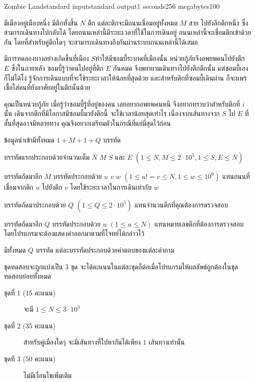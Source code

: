 \documentclass[11pt,a4paper]{article}
\begin{document}
\begin{problem}{Zombie Land}{standard input}{standard output}{1 seconds}{256 megabytes}{100}

มีเมืองอยู่เมืองหนึ่ง มีตึกทั้งสิ้น $N$ ตึก แต่ละตึกจะมีถนนเชื่อมอยู่ทั้งหมด $M$ สาย ไปยังอีกตึกหนึ่ง ซึ่งสามารถเดินทางไปกลับได้ โดยถนนเหล่านี้มีระยะเวลาที่ใช้ในการเดินอยู่ ถนนเหล่านี้จะเชื่อมตึกเข้าด้วยกัน โดยที่สำหรับคู่ตึกใดๆ จะสามารถเดินทางถึงกันผ่านระบบถนนเหล่านี้ได้เสมอ

มีการทดลองบางอย่างเกิดขึ้นที่เมือง $S$ทำให้มีซอมบี้ระบาดที่เมืองนั้น หน่วยกู้ภัยจึงอพยพคนไปยังตึก $E$ ซึ่งในภายหลัง ซอมบี้รู้ว่าคนไปอยู่ที่ตึก $E$ กันหมด จึงพยายามเดินทางไปยังตึกตึกนั้น แต่ซอมบี้เองก็ไม่ได้โง่ รู้จักการเดินแบบที่จะใช้ระยะเวลาให้น้อยที่สุดด้วย และสำหรับตึกที่ซอมบี้เดินผ่าน ก็จะแพร่เชื้อใส่คนที่ยังอาศัยอยู่ในตึกนั้นด้วย

คุณเป็นหน่วยกู้ภัย เมื่อรู้ว่าซอมบี้รู้ที่อยู่ของคน เลยอยากอพยพคนหนี จึงอยากทราบว่าสำหรับตึกที่ $i$ นั้น เดินจากตึกที่มีโอกาสมีซอมบี้มายังตึกนี้ จะใช้เวลาน้อยสุดเท่าไร เนื่องจากเส้นทางจาก $S$ ไป $E$ ที่สั้นที่สุดอาจมีหลายทาง คุณจึงอยากเตรียมตัวในกรณีที่แย่มี่สุดไว้ก่อน

\InputFile
ข้อมูลนำเข้ามีทั้งหมด $1 + M + 1 + Q$ บรรทัด

บรรทัดแรกประกอบด้วยจำนวนเต็ม $N$ $M$ $S$ และ $E$ $(1 \leq N, M \leq 2 \cdot 10^5, 1 \leq S, E \leq N)$ 

บรรทัดถัดมาอีก $M$ บรรทัดประกอบด้วย $u$ $v$ $w$ $(1 \leq u != v \leq N, 1 \leq w \leq 10^9)$ แทนถนนที่เชื่อมจากตึก $u$ ไปยังตึก $v$ โดยใช้ระยะเวลาในการเดินเท่ากับ $w$

บรรทัดถัดมาประกอบด้วย $Q$ $(1 \leq Q \leq 2 \cdot 10^5)$ แทนจำนวนตึกที่คุณต้องการตรวจสอบ

บรรทัดถัดมาอีก $Q$ บรรทัดประกอบด้วย $u$ $(1 \leq u \leq N)$ แทนหมายเลขตึกที่ต้องการตรวจสอบ โดยโปรแกรมจะต้องแสดงค่าออกมาตามที่โจทย์ได้กล่าวไว้

\OutputFile
มีทั้งหมด $Q$ บรรทัด แต่ละบรรทัดประกอบด้วยคำตอบของแต่ละคำถาม

\Scoring
ชุดทดสอบจะถูกแบ่งเป็น 3 ชุด จะได้คะแนนในแต่ละชุดก็ต่อเมื่อโปรแกรมให้ผลลัพธ์ถูกต้องในชุดทดสอบย่อยทั้งหมด

\begin{description}

\item[ชุดที่ 1 (15 คะแนน)] จะมี $ 1 \leq N \leq 3 \cdot 10^3 $

\item[ชุดที่ 2 (35 คะแนน)] สำหรับคู่เมืองใดๆ จะมีเส้นทางที่ไปหากันได้เพียง $1$ เส้นทางเท่านั้น

\item[ชุดที 3 (50 คะแนน)] ไม่มีเงื่อนไขเพิ่มเติม

\end{description}

\Examples

\begin{example}
\end{example}

\end{problem}
\end{document}
